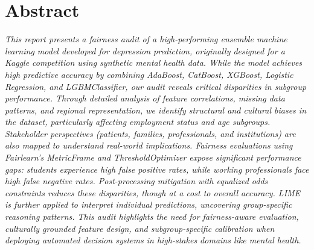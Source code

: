 \newpage
\chapter*{\centering Abstract}
\textit{\quad 
This report presents a fairness audit of a high-performing ensemble machine learning model developed for depression prediction, originally designed for a Kaggle competition using synthetic mental health data. While the model achieves high predictive accuracy by combining AdaBoost, CatBoost, XGBoost, Logistic Regression, and LGBMClassifier, our audit reveals critical disparities in subgroup performance. Through detailed analysis of feature correlations, missing data patterns, and regional representation, we identify structural and cultural biases in the dataset, particularly affecting employment status and age subgroups. Stakeholder perspectives (patients, families, professionals, and institutions) are also mapped to understand real-world implications. Fairness evaluations using Fairlearn’s MetricFrame and ThresholdOptimizer expose significant performance gaps: students experience high false positive rates, while working professionals face high false negative rates. Post-processing mitigation with equalized odds constraints reduces these disparities, though at a cost to overall accuracy. LIME is further applied to interpret individual predictions, uncovering group-specific reasoning patterns. This audit highlights the need for fairness-aware evaluation, culturally grounded feature design, and subgroup-specific calibration when deploying automated decision systems in high-stakes domains like mental health.
}


